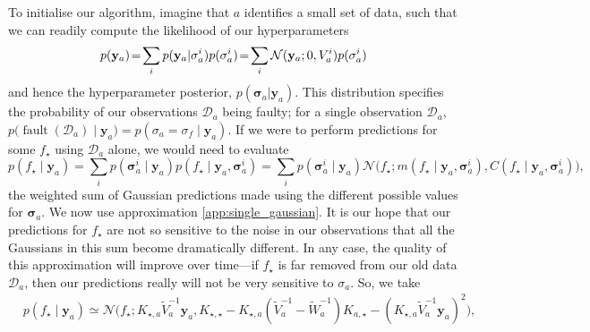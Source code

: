 \documentclass{article} %
\newcommand{\deq}{=}
\newcommand{\given}{\!\ensuremath{\mid}\!}
\newcommand{\cm}[1]{\ensuremath{\mathcal{#1}}}
\newcommand{\bm}[1]{\ensuremath{\mathbf{#1}}}
\newcommand{\data}{\ensuremath{\cm{D}}}
\newcommand{\vect}[1]{\bm{#1}}
\newcommand{\vy}{\vect{y}}
\newcommand{\vs}{\vect{\sigma}}
\newcommand{\amean}[2]{\tilde{{m}}(#1 \given #2 )}
\newcommand{\acov}[2]{\tilde{{C}}(#1 \given #2 )}
\newcommand{\p}[2]{p(#1\given#2)}
\newcommand{\fPr}{p}
\newcommand{\Prob}[2]{\fPr(#1 \given #2 )}
\newcommand{\ps}[2]{p(#1\vert#2)}
\newcommand{\mean}[2]{{m}(#1\given#2)}
\newcommand{\cov}[2]{{C}(#1\given#2)}
\newcommand{\N}[3]{\cm{N}( #1;#2,#3 )}
\newcommand{\st}{_{\star}}
\DeclareMathOperator{\fault}{fault}
\begin{document}
To initialise our algorithm, imagine that $a$ identifies a small set
of data, such that we can readily compute the likelihood of our hyperparameters
\begin{equation}
 \hspace{-0.0cm}p(\vy_a)\!=\!\sum_i  \ps{\vy_a}{\vs^i_a}\fPr(\vs^i_a)
\!=\! \sum_i \N{\vy_a}{0}{V_a^i}\fPr(\vs_a^i) \label{eq:likelihood_a}
\end{equation}
and hence the hyperparameter posterior, $\ps{\vs_a}{\vy_{a}}$.
This distribution specifies the probability of our observations
$\data_a$ being faulty; for a single observation $\data_a$,
$
p\bigl(\fault(\data_a) \given \vy_{a}\bigr) = \Prob{\sigma_a = \sigma_f}{\vy_{a}}
$.
If we were to perform predictions for some $f\st$ using $\data_a$
alone, we would need to evaluate
\begin{equation*}
\p{f\st}{\vy_{a}} = \sum_{i} \Prob{\vs^i_{a}}{\vy_a} \p{f\st}{\vy_a, \vs^{i}_{a}}
=\sum_{i} \Prob{\vs^i_{a}}{\vy_a} \cm{N}\bigl(f\st; \mean{f\st}{\vy_a, \vs^{i}_{a}}, \cov{f\st}{\vy_a, \vs^{i}_{a}}\bigr),
\end{equation*}
the weighted sum of Gaussian predictions made using the different
possible values for $\vs_{a}$.  We now use approximation \ref{app:single_gaussian}. It is our hope that our predictions
for $f\st$ are not so sensitive to the noise in our observations that
all the Gaussians in this sum become dramatically different. In any
case, the quality of this approximation will improve over time---if
$f\st$ is far removed from our old data $\data_a$, then our
predictions really will not be very sensitive to $\sigma_a$. So, we take
\begin{align*}
 &\p{f\st}{\vy_{a}} \simeq \cm{N}\bigl(f\st; K_{\star,a} \tilde{V}_a^{-1} \vy_a, K_{\star,\star} - K_{\star,a}(\tilde{V}_a^{-1}-\tilde{W}_a^{-1})K_{a,\star} 
 - (K_{\star,a} \tilde{V}_a^{-1}\vy_a)^2\bigr),%
\end{align*}
\end{document}
